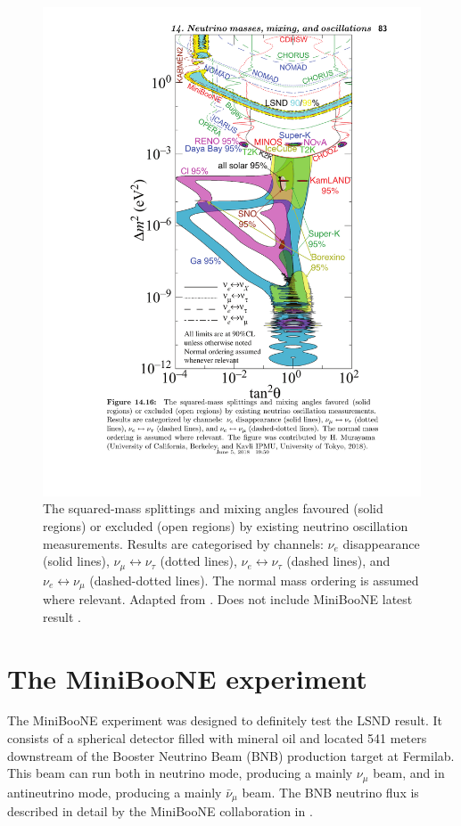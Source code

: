 \begin{figure}[htbp]
    \centering
    \includegraphics[width=0.7\linewidth]{figures/globalfit.pdf}
    \caption{The squared-mass splittings and mixing angles favoured (solid regions) or excluded (open regions) by existing neutrino oscillation measurements. Results are categorised by channels: $\nu_e$ disappearance (solid lines), $\nu_{\mu} \leftrightarrow \nu_{\tau}$  (dotted lines), $\nu_{e} \leftrightarrow \nu_{\tau}$ (dashed lines), and $\nu_{e} \leftrightarrow \nu_{\mu}$ (dashed-dotted lines). The normal mass ordering is assumed where relevant. Adapted from \cite{PhysRevD.98.030001}. Does not include MiniBooNE latest result \cite{Aguilar-Arevalo:2018gpe}.}
    \label{fig:globalfit}
\end{figure}

\section{The MiniBooNE experiment}
The MiniBooNE experiment was designed to definitely test the LSND result. It consists of a spherical detector filled with mineral oil and located 541 meters downstream of the Booster Neutrino Beam (BNB) production target at Fermilab. This beam can run both in neutrino mode, producing a mainly $\nu_{\mu}$ beam, and in antineutrino mode, producing a mainly $\bar{\nu}_{\mu}$ beam. The BNB neutrino flux is described in detail by the MiniBooNE collaboration in \cite{AguilarArevalo:2008yp}.

